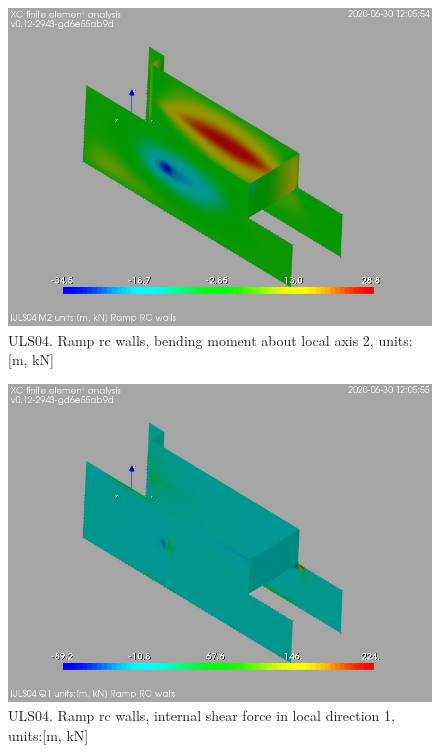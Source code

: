 \begin{figure}
\begin{center}
\includegraphics[width=\linewidth]{ramp_wall/resLC/text/graphics/resSimplLC/lULS04wallsM2}
\caption{ULS04. Ramp rc walls, bending moment about local axis 2, units:[m, kN]}
\end{center}
\end{figure}
\begin{figure}
\begin{center}
\includegraphics[width=\linewidth]{ramp_wall/resLC/text/graphics/resSimplLC/lULS04wallsQ1}
\caption{ULS04. Ramp rc walls, internal shear force in local direction 1, units:[m, kN]}
\end{center}
\end{figure}
